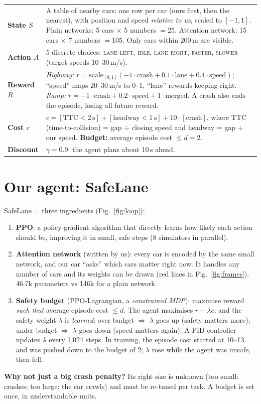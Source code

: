 \documentclass[10pt,twocolumn,a4paper]{article}
\newcommand{\term}[1]{\textbf{#1}}
\begin{document}
\smallskip
\renewcommand{\arraystretch}{1.2}
\noindent\begin{tabularx}{\columnwidth}{@{}>{\raggedright\bfseries\leavevmode\color{accent}}p{1.25cm}X@{}}
\toprule
State $S$ & A table of nearby cars: one row per car (ours first, then the nearest), with position and speed \emph{relative to us},
scaled to $[-1,1]$. Plain networks: 5 cars $\times$ 5 numbers $=25$. Attention network: 15 cars $\times$ 7 numbers $=105$.
Only cars within 200\,m are visible.\\
Action $A$ & 5 discrete choices: \textsc{lane-left}, \textsc{idle}, \textsc{lane-right}, \textsc{faster}, \textsc{slower}
(target speeds 10--30\,m/s).\\
Reward $R$ & \emph{Highway:} $r=\text{scale}_{[0,1]}(-1\cdot\text{crash}+0.1\cdot\text{lane}+0.4\cdot\text{speed})$; ``speed'' maps
20--30\,m/s to 0--1, ``lane'' rewards keeping right.\newline
\emph{Ramp:} $r=-1\cdot\text{crash}+0.2\cdot\text{speed}+1\cdot\text{merged}$.\newline
A crash also ends the episode, losing all future reward.\\
Cost $c$ & $c=[\text{TTC}<2\,\text{s}]+[\text{headway}<1\,\text{s}]+10\cdot[\text{crash}]$, where TTC (time-to-collision) = gap $\div$
closing speed and headway = gap $\div$ our speed. \textbf{Budget:} average episode cost $\le d=2$.\\
Discount & $\gamma=0.9$: the agent plans about 10\,s ahead.\\
\bottomrule
\end{tabularx}

\section{Our agent: SafeLane}
SafeLane = three ingredients (Fig.~\ref{fig:loop}):
\begin{enumerate}
\item \term{PPO}: a policy-gradient algorithm that directly learns how likely each action should be, improving it in small, safe steps
(8 simulators in parallel).
\item \term{Attention network} (written by us): every car is encoded by the same small network, and our car ``asks'' which cars matter
right now. It handles any number of cars and its weights can be drawn (red lines in Fig.~\ref{fig:frames}). 46.7k parameters vs 146k for a plain network.
\item \term{Safety budget} (PPO-Lagrangian, a \emph{constrained MDP}): maximise reward \emph{such that} average episode cost $\le d$.
The agent maximises $r-\lambda c$, and the safety weight $\lambda$ is \emph{learned}: over budget $\Rightarrow$ $\lambda$ goes up (safety
matters more); under budget $\Rightarrow$ $\lambda$ goes down (speed matters again). A PID controller updates $\lambda$ every 1{,}024 steps. In training, the episode cost started at 10--13 and was pushed down to the budget of 2; $\lambda$ rose while the agent was unsafe, then fell.
\end{enumerate}
\term{Why not just a big crash penalty?} Its right size is unknown (too small: crashes; too large: the car crawls) and must be
re-tuned per task. A budget is set once, in understandable units.
\end{document}
